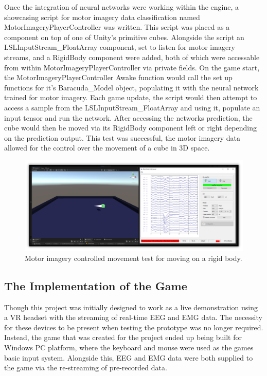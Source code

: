 \documentclass[11pt, a4paper]{article}
\begin{document}
\hfill

Once the integration of neural networks were working within the engine, a showcasing script for motor imagery data classification named MotorImageryPlayerController was written. This script was placed as a component on top of one of Unity's primitive cubes. Alongside the script an LSLInputStream\_FloatArray component, set to listen for motor imagery streams, and a RigidBody component were added, both of which were accessable from within MotorImageryPlayerController via private fields. On the game start, the MotorImageryPlayerController Awake function would call the set up functions for it's Baracuda\_Model object, populating it with the neural network trained for motor imagery. Each game update, the script would then attempt to access a sample from the LSLInputStream\_FloatArray and using it, populate an input tensor and run the network. After accessing the networks prediction, the cube would then be moved via its RigidBody component left or right depending on the prediction output. This test was successful, the motor imagery data allowed for the control over the movement of a cube in 3D space.  


\begin{figure}[H]
	\centering
	\includegraphics[width = 0.9 \linewidth] {[ Figures ]/Motor Imagery Test.png}
	\captionsetup{font = small, labelfont = small, width=.8\linewidth}
	\caption{Motor imagery controlled movement test for moving on a rigid body.}
	\label{fig:machine_learning_:_box_movement_showcase}
\end{figure}






\pagebreak
\subsection{The Implementation of the Game}

Though this project was initially designed to work as a live demonstration using a VR headset with the streaming of real-time EEG and EMG data. The necessity for these devices to be present when testing the prototype was no longer required. Instead, the game that was created for the project ended up being built for Windows PC platform, where the keyboard and mouse were used as the games basic input system. Alongside this, EEG and EMG data were both supplied to the game via the re-streaming of pre-recorded data.  
\end{document}
